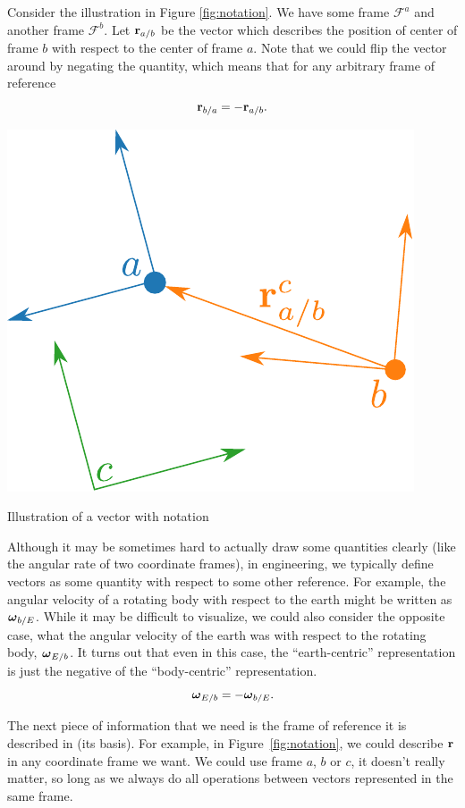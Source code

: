 Consider the illustration in Figure \ref{fig:notation}.
We have some frame $\mathcal{F}^a$ and another frame $\mathcal{F}^b$. Let $\mathbf{r}_{a/b}$ be
the vector which describes the position of center of frame $b$ with respect to the center of frame $a$.
Note that we could flip the vector around by negating the quantity,
which means that for any arbitrary frame of reference
\[
\mathbf{r}_{b/a}=-\mathbf{r}_{a/b}.
\]
\begin{marginfigure}
\includegraphics[width=\linewidth]{chap2_preliminaries/figures/frame}
\caption{Illustration of a vector with notation}
\label{fig:notation}
\end{marginfigure}

Although it may be sometimes hard to actually draw some quantities
clearly (like the angular rate of two coordinate frames), in engineering,
we typically define vectors as some quantity with respect to some
other reference. For example, the angular velocity of a rotating body
with respect to the earth might be written as $\boldsymbol{\omega}_{b/E}$. While it
may be difficult to visualize, we could also consider the opposite
case, what the angular velocity of the earth was with respect to the
rotating body, $\boldsymbol{\omega}_{E/b}$. It turns out that even in
this case, the ``earth-centric'' representation is just the negative
of the ``body-centric'' representation.
\[
\boldsymbol{\omega}_{E/b}=-\boldsymbol{\omega}_{b/E}.
\]

The next piece of information that we need is the frame of reference
it is described in (its basis). For example, in Figure~\ref{fig:notation},
we could describe $\mathbf{r}$ in any coordinate frame we want. We could
use frame $a$, $b$ or $c$, it doesn't really matter, so long as
we always do all operations between vectors represented in the same
frame.

